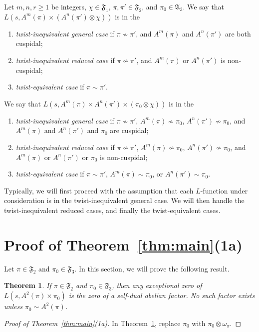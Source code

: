 \documentclass[11pt]{amsart}
\newtheorem{theorem}{Theorem}[section]
\theoremstyle{remark}
\newcommand{\fF}{\mathfrak{F}}
\numberwithin{equation}{section}
\begin{document}
Let $m,n,r\geq 1$ be integers, $\chi \in \fF_1$, $\pi,\pi' \in \fF_2$, and $\pi_0\in\mathfrak{A}_3$.  We say that $L(s,A^m(\pi)\times (A^n(\pi')\otimes\chi))$ is in the
\begin{enumerate}
	\item {\it twist-inequivalent general case} if $\pi \not\sim \pi'$, and $A^m(\pi)$ and $A^n(\pi')$ are both cuspidal;
	\item {\it twist-inequivalent reduced case} if $\pi \not\sim \pi'$, and $A^m(\pi)$ or $A^n(\pi')$ is non-cuspidal;
	\item {\it twist-equivalent case} if $\pi \sim \pi'$.
\end{enumerate}
We say that $L(s,A^m(\pi)\times A^n(\pi')\times(\pi_0\otimes\chi))$ is in the
\begin{enumerate}
	\item {\it twist-inequivalent general case} if $\pi \not\sim \pi'$, $A^m(\pi)\not\sim\pi_0$,  $A^n(\pi')\not\sim\pi_0$, and $A^m(\pi)$ and $A^n(\pi')$ and $\pi_0$ are cuspidal;
	\item {\it twist-inequivalent reduced case} if $\pi \not\sim \pi'$, $A^m(\pi)\not\sim\pi_0$,  $A^n(\pi')\not\sim\pi_0$, and $A^m(\pi)$ or $A^n(\pi')$ or $\pi_0$ is non-cuspidal;
	\item {\it twist-equivalent case} if $\pi \sim \pi'$, $A^m(\pi)\sim\pi_0$, or $A^n(\pi')\sim\pi_0$.
\end{enumerate}
Typically, we will first proceed with the assumption that each $L$-function under consideration is in the twist-inequivalent general case.  We will then handle the twist-inequivalent reduced cases, and finally the twist-equivalent cases.

\section{Proof of Theorem~\ref{thm:main}(1a)}
\label{sec:1a}

Let $\pi \in \fF_2$ and $\pi_0 \in \fF_3$.  In this section, we will prove the following result.

\begin{theorem}
\label{thm:GL3xGL3}
If $\pi \in \fF_2$ and $\pi_0 \in \fF_3$, then any exceptional zero of $L(s,A^2(\pi)\times\pi_0)$ is the zero of a self-dual abelian factor.  No such factor exists unless $\pi_0\sim A^2(\pi)$.
\end{theorem}
\begin{proof}[Proof of Theorem~\ref{thm:main}(1a)]
In Theorem~\ref{thm:GL3xGL3}, replace $\pi_0$ with $\pi_0\otimes\omega_{\pi}$.
\end{proof}
\end{document}
